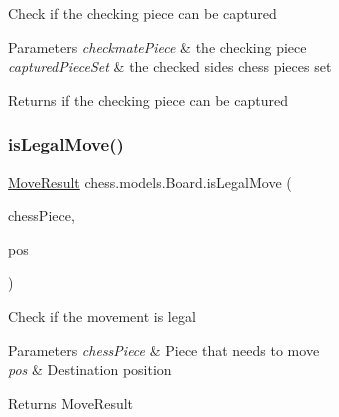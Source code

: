 Check if the checking piece can be captured


\begin{DoxyParams}{Parameters}
{\em checkmate\+Piece} & the checking piece \\
\hline
{\em captured\+Piece\+Set} & the checked side\textquotesingle{}s chess pieces set \\
\hline
\end{DoxyParams}
\begin{DoxyReturn}{Returns}
if the checking piece can be captured 
\end{DoxyReturn}
\mbox{\label{classchess_1_1models_1_1_board_a2514b6b830efc0aeeb2ba6f64aa033e2}} 
\subsubsection{\texorpdfstring{is\+Legal\+Move()}{isLegalMove()}}
{\footnotesize\ttfamily \mbox{\hyperlink{enumchess_1_1models_1_1enums_1_1_move_result}{Move\+Result}} chess.\+models.\+Board.\+is\+Legal\+Move (\begin{DoxyParamCaption}\item[{\mbox{\hyperlink{classchess_1_1models_1_1_chess_piece}{Chess\+Piece}}}]{chess\+Piece,  }\item[{\mbox{\hyperlink{classchess_1_1models_1_1_position}{Position}}}]{pos }\end{DoxyParamCaption})}

Check if the movement is legal


\begin{DoxyParams}{Parameters}
{\em chess\+Piece} & Piece that needs to move \\
\hline
{\em pos} & Destination position \\
\hline
\end{DoxyParams}
\begin{DoxyReturn}{Returns}
Move\+Result 
\end{DoxyReturn}
\mbox{\label{classchess_1_1models_1_1_board_a8ffee6403d98b5e5e68c0a2b73440100}} 

